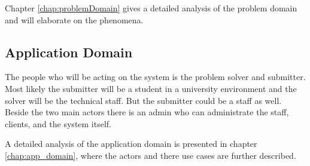 Chapter \ref{chap:problemDomain} gives a detailed analysis of the problem domain and will elaborate on the phenomena.

\subsection{Application Domain}
The people who will be acting on the system is the problem solver and submitter. Most likely the submitter will be a student in a university environment and the solver will be the technical staff. But the submitter could be a staff as well. Beside the two main actors there is an admin who can administrate the staff, clients, and the system itself.

A detailed analysis of the application domain is presented in chapter \ref{chap:app_domain}, where the actors and there use cases are further described.